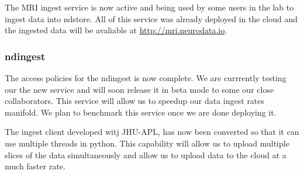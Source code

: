 \documentclass[simplex.tex]{subfiles}
\begin{document}
The MRI ingest service is now active and being used by some users in the lab to ingest data into ndstore. All of this service was already deployed in the cloud and the ingested data will be avaliable at \href{http://mri.neurodata.io}{http://mri.neurodata.io}.


\subsubsection{ndingest}

The access policies for the ndingest is now complete. We are currrently testing our the new service and will soon release it in beta mode to some our close collaborators. This service will allow us to speedup our data ingest rates manifold. We plan to benchmark this service once we are done deploying it.

The ingest client developed witj JHU-APL, has now been converted so that it can use multiple threads in python. This capability will allow us to upload multiple slices of the data simultaneously and allow us to upload data to the cloud at a much faster rate. 
\end{document}
